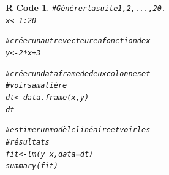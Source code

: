 \documentclass[11pt]{beamer}\usepackage[]{graphicx}\usepackage[]{color}
\makeatletter
\newcommand{\hlnum}[1]{\textcolor[rgb]{0.063,0.58,0.627}{#1}}%
\newcommand{\hlcom}[1]{\textcolor[rgb]{0.588,0.588,0.588}{#1}}%
\newcommand{\hlopt}[1]{\textcolor[rgb]{0.196,0.196,0.196}{#1}}%
\newcommand{\hlstd}[1]{\textcolor[rgb]{0.196,0.196,0.196}{#1}}%
\newcommand{\hlkwb}[1]{\textcolor[rgb]{0.627,0,0.314}{#1}}%
\newcommand{\hlkwc}[1]{\textcolor[rgb]{0,0.631,0.314}{#1}}%
\newcommand{\hlkwd}[1]{\textcolor[rgb]{0.78,0.227,0.412}{#1}}%
\newenvironment{kframe}{%
 \def\at@end@of@kframe{}%
 \ifinner\ifhmode%
  \def\at@end@of@kframe{\end{minipage}}%
  \begin{minipage}{\columnwidth}%
 \fi\fi%
 \def\FrameCommand##1{\hskip\@totalleftmargin \hskip-\fboxsep
 \colorbox{shadecolor}{##1}\hskip-\fboxsep
     \hskip-\linewidth \hskip-\@totalleftmargin \hskip\columnwidth}%
 \MakeFramed {\advance\hsize-\width
   \@totalleftmargin\z@ \linewidth\hsize
   \@setminipage}}%
 {\par\unskip\endMakeFramed%
 \at@end@of@kframe}
\newenvironment{knitrout}{}{} %
\newtheorem{rcode}{R Code}[section]
\makeatother
\begin{document}
\begin{frame}
\begin{knitrout}
\color{fgcolor}\begin{kframe}
\begin{rcode}\begin{alltt}
\hlcom{# Générer la suite 1, 2, ..., 20.}
\hlstd{x} \hlkwb{<-} \hlnum{1}\hlopt{:}\hlnum{20}

\hlcom{# créer un autre vecteur en fonction de x}
\hlstd{y} \hlkwb{<-} \hlnum{2}\hlopt{*}\hlstd{x}\hlopt{+}\hlnum{3}

\hlcom{# créer un data frame de deux colonnes et}
\hlcom{# voir sa matière }
\hlstd{dt} \hlkwb{<-} \hlkwd{data.frame}\hlstd{(x, y)}
\hlstd{dt}

\hlcom{# estimer un modèle linéaire et voir les}
\hlcom{# résultats}
\hlstd{fit} \hlkwb{<-} \hlkwd{lm}\hlstd{(y} \hlopt{~} \hlstd{x,} \hlkwc{data} \hlstd{= dt)}
\hlkwd{summary}\hlstd{(fit)}
\end{alltt}
\end{rcode}\end{kframe}
\end{knitrout}
\end{frame}
\end{document}
